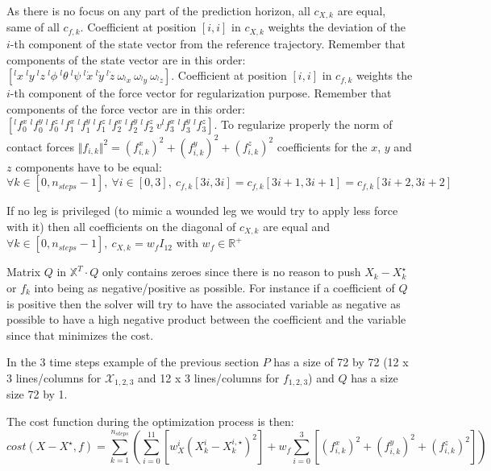 \documentclass[a4paper,11pt]{article}
\begin{document}
As there is no focus on any part of the prediction horizon, all $c_{X,k}$ are equal, same of all $c_{f,k}$. Coefficient at position $[i,i]$ in $c_{X,k}$ weights the deviation of the $i$-th component of the state vector from the reference trajectory. Remember that components of the state vector are in this order: $[ {}^l\!x ~ {}^l\!y ~ {}^l\!z ~ {}^l\!\phi ~ {}^l\!\theta ~ {}^l\!\psi ~ {}^l\!\dot x ~ {}^l\!\dot y ~{}^l\! \dot z ~ \omega_{{}^l\!x} ~  \omega_{{}^l\!y} ~ \omega_{{}^l\! z} ]$. Coefficient at position $[i,i]$ in $c_{f,k}$ weights the $i$-th component of the force vector for regularization purpose. Remember that components of the force vector are in this order: $[ {}^l\!f_0^x ~ {}^l\!f_0^y ~ {}^l\!f_0^z ~ {}^l\!f_1^x ~ {}^l\!f_1^y ~ {}^l\!f_1^z ~ {}^l\!f_2^x ~ {}^l\!f_2^y ~ {}^l\!f_2^z ~ v {}^l\!f_3^x ~ {}^l\!f_3^y ~ {}^l\!f_3^z ]$. To regularize properly the norm of contact forces $\Vert f_{i,k} \Vert^2 = (f_{i,k}^{x})^2 + (f_{i,k}^{y})^2 + (f_{i,k}^{z})^2$ coefficients for the $x$, $y$ and $z$ components have to be equal:
\begin{equation}
	\forall k \in [0, n_{steps}-1],~\forall i \in [0, 3],~ c_{f,k}[3i,3i] = c_{f,k}[3i+1,3i+1] = c_{f,k}[3i+2,3i+2]
\end{equation}

If no leg is privileged (to mimic a wounded leg we would try to apply less force with it) then all coefficients on the diagonal of $c_{X,k}$ are equal and $\forall k \in [0, n_{steps}-1],~c_{X,k}=w_f I_{12}$ with $w_f \in \mathbb{R}^+$

Matrix $Q$ in $\mathbb{X}^T \cdot Q$ only contains zeroes since there is no reason to push $X_k - X_k^\star$ or $f_k$ into being as negative/positive as possible. For instance if a coefficient of $Q$ is positive then the solver will try to have the associated variable as negative as possible to have a high negative product between the coefficient and the variable since that minimizes the cost.

In the 3 time steps example of the previous section $P$ has a size of 72 by 72 (12 x 3 lines/columns for $\mathcal{X}_{1,2,3}$ and 12 x 3 lines/columns for $f_{1,2,3}$) and $Q$ has a size size 72 by 1.

The cost function during the optimization process is then:
\begin{equation}
cost(X - X^\star, f) = \sum_{k=1}^{n_{steps}} \left( \sum_{i=0}^{11} \left[  w_{X}^i (X_k^i - X_k^{i,\star})^2  \right] + w_f \sum_{i=0}^{3} \left[ (f_{i,k}^x)^2 + (f_{i,k}^y)^2 + (f_{i,k}^z)^2 \right] \right)
\end{equation}
\end{document}
